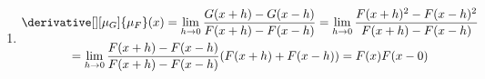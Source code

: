 \begin{solution}
\begin{enumerate}[label = (\alph*)]
\begin{comment}
        Weil das für alle $\epsilon$ gilt, muss $\mu_G(K) = 0$.
        $\mu_G$ ist sigmaendlich, also insbesondere regulär von unten, d.h.

        \begin{align*}
            \mu_G(A) = \sup \Bbraces{\mu_G(K): K \subseteq A, ~\text{kompakt}}.
        \end{align*}

        Damit gilt aber $\mu_G(A) = 0$.

    \end{comment}

    \item

    \begin{multline*}
        \derivative[][\mu_G]{\mu_F}(x)
        =
        \lim_{h \to 0}
            \frac{G(x + h) - G(x - h)}{F(x + h) - F(x - h)}
        =
        \lim_{h \to 0}
            \frac{F(x + h)^2 - F(x - h)^2}{F(x + h) - F(x - h)} \\
        =
        \lim_{h \to 0}
            \frac{F(x + h) - F(x - h)}{F(x + h) - F(x - h)}
            (F(x + h) + F(x - h))
        =
        F(x) F(x - 0)
    \end{multline*}

\end{enumerate}


\end{solution}

    